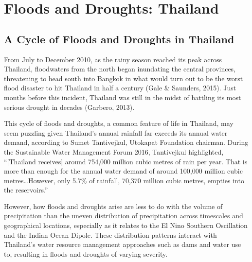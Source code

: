 \chapter{Floods and Droughts: Thailand}

\section{A Cycle of Floods and Droughts in Thailand}

From July to December 2010, as the rainy season reached its peak across Thailand, floodwaters from the north began inundating the central provinces, threatening to head south into Bangkok in what would turn out to be the worst flood disaster to hit Thailand in half a century (Gale \& Saunders, 2015). Just months before this incident, Thailand was still in the midst of battling its most serious drought in decades (Garbero, 2013). 

This cycle of floods and droughts, a common feature of life in Thailand, may seem puzzling given Thailand's annual rainfall far exceeds its annual water demand, according to Sumet Tantivejkul, Utokapat Foundation chairman. During the Sustainable Water Management Forum 2016, Tantivejkul highlighted, ``[Thailand receives] around 754,000 million cubic metres of rain per year. That is more than enough for the annual water demand of around 100,000 million cubic metres\ldots However, only 5.7\% of rainfall, 70,370 million cubic metres, empties into the reservoirs.''

However, how floods and droughts arise are less to do with the volume of precipitation than the uneven distribution of precipitation across timescales and geographical locations, especially as it relates to the El Nino Southern Oscillation and the Indian Ocean Dipole. These distribution patterns interact with Thailand's water resource management approaches such as dams and water use to, resulting in floods and droughts of varying severity.

